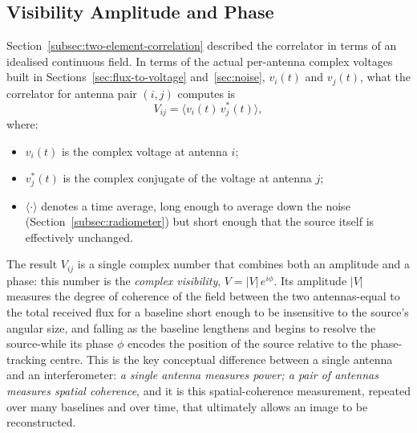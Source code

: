 \subsection{Visibility Amplitude and Phase}
\label{subsec:visibility-amp-phase}
Section~\ref{subsec:two-element-correlation} described the correlator in
terms of an idealised continuous field. In terms of the actual per-antenna
complex voltages built in Sections~\ref{sec:flux-to-voltage}
and~\ref{sec:noise}, $v_i(t)$ and $v_j(t)$, what the correlator for antenna
pair $(i,j)$ computes is
\begin{equation}
  V_{ij} = \big\langle v_i(t)\,v_j^{*}(t) \big\rangle ,
  \label{eq:correlator-def}
\end{equation}
where:
\begin{itemize}[leftmargin=1.5em,itemsep=1pt,topsep=2pt]
  \item $v_i(t)$ is the complex voltage at antenna $i$;
  \item $v_j^{*}(t)$ is the complex conjugate of the voltage at antenna $j$;
  \item $\langle\cdot\rangle$ denotes a time average, long enough to average
        down the noise (Section~\ref{subsec:radiometer}) but short enough
        that the source itself is effectively unchanged.
\end{itemize}
The result $V_{ij}$ is a single complex number that combines both an
amplitude and a phase: this number is the \emph{complex visibility},
$V=|V|\,e^{i\phi}$. Its amplitude $|V|$ measures the degree of coherence of
the field between the two antennas-equal to the total received flux for a
baseline short enough to be insensitive to the source's angular size, and
falling as the baseline lengthens and begins to resolve the source-while its
phase $\phi$ encodes the position of the source relative to the
phase-tracking centre. This is the key conceptual difference between a single
antenna and an interferometer: \emph{a single antenna measures power; a pair
of antennas measures spatial coherence}, and it is this spatial-coherence
measurement, repeated over many baselines and over time, that ultimately
allows an image to be reconstructed.

